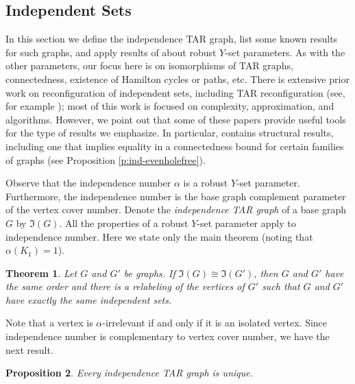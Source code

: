 \documentclass{article}
\numberwithin{figure}{section}
\numberwithin{table}{section}
\numberwithin{equation}{section}
\newtheorem{thm}{Theorem}[section]
\newtheorem{prop}[thm]{Proposition}
\theoremstyle{definition}
\theoremstyle{definition}
\theoremstyle{definition}
\newcommand{\itar}{\mathfrak{I}}%
\begin{document}
{%
\subsection{Independent Sets}\label{ss:independent}




In this section  we  define the independence TAR graph, list some known results for such graphs, and apply results of about robust $Y$-set parameters.  
As with the other parameters, our focus here is on isomorphisms of TAR graphs, connectedness, existence of Hamilton cycles or paths, etc.  There 
is extensive prior work on reconfiguration of  independent sets, including TAR reconfiguration (see, for example \cite{IDHPSUU11,KMM12});  most of this work is focused on complexity, approximation, and algorithms.  However, we point out that some of these papers provide useful tools for the type of results we emphasize. In particular,  \cite{KMM12} contains structural results, including one that  implies  equality in a connectedness bound   for certain families of graphs   (see Proposition \ref{p:ind-evenholefree}).
  
   Observe that the independence number  $\alpha$  
   is a robust $Y$-set parameter.   Furthermore, the independence number is the base graph complement  parameter of the vertex cover number.
  Denote the \emph{independence TAR graph}   of a  base graph  $G$ by  $\itar(G)$. %
 All the properties of a robust $Y$-set parameter apply to independence number.   Here we state only the main theorem (noting that $\alpha(K_1)=1$).

 \begin{thm}\label{t:main-indep}  Let $G$ and $G'$ be graphs. If $\itar(G)\cong\itar(G')$, then  $G$ and $G'$ have the same order and  there is a relabeling of the vertices of $G'$ such that $G$ and $G'$ have exactly the same independent sets.  \end{thm}
 
Note that a vertex is $\alpha$-irrelevant if and only if it is an isolated vertex. Since independence number is complementary to vertex cover number, we have the next result.

 \begin{prop}\label{p:Iunique} 
Every independence TAR graph is unique.     \end{prop}

}
\end{document}
